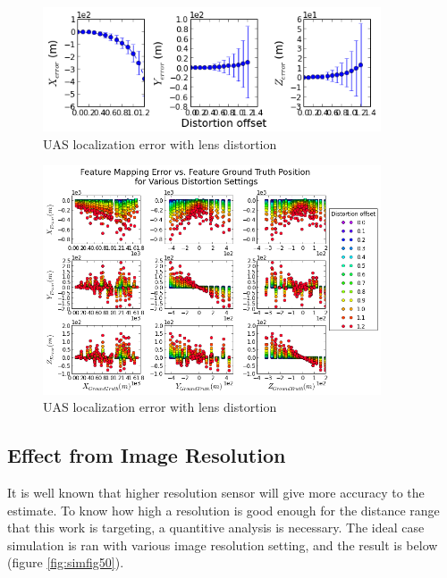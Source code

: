 \begin{figure}[h]
  \centering
  \includegraphics[width=10cm,keepaspectratio=true]{./Figures/SimulationFigures/Figure45.png}
  \caption{UAS localization error with lens distortion}
  \label{fig:simfig45}
\end{figure}

\begin{figure}[h]
  \centering
  \includegraphics[width=10cm,keepaspectratio=true]{./Figures/SimulationFigures/Figure46.png}
  \caption{UAS localization error with lens distortion}
  \label{fig:simfig46}
\end{figure}

\FloatBarrier

\subsection{Effect from Image Resolution}

It is well known that higher resolution sensor will give more accuracy
to the estimate. To know how high a resolution is good enough for the
distance range that this work is targeting, a quantitive analysis is
necessary. The ideal case simulation is ran with various image
resolution setting, and the result is below (figure \ref{fig:simfig50}). 

